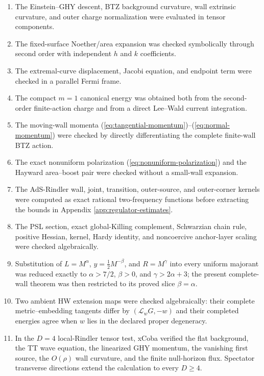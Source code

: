 \begin{enumerate}
\def\labelenumi{\arabic{enumi}.}
\tightlist
\item
  The Einstein--GHY descent, BTZ background curvature, wall extrinsic curvature, and outer charge normalization were evaluated in tensor components.
\item
  The fixed-surface Noether/area expansion was checked symbolically through second order with independent $h$ and $k$ coefficients.
\item
  The extremal-curve displacement, Jacobi equation, and endpoint term were checked in a parallel Fermi frame.
\item
  The compact $m=1$ canonical energy was obtained both from the second-order finite-action charge and from a direct Lee--Wald current integration.
\item
  The moving-wall momenta (\ref{eq:tangential-momentum})--(\ref{eq:normal-momentum}) were checked by directly differentiating the complete finite-wall BTZ action.
\item
  The exact nonuniform polarization (\ref{eq:nonuniform-polarization}) and the Hayward area--boost pair were checked without a small-wall expansion.
\item
  The AdS-Rindler wall, joint, transition, outer-source, and outer-corner kernels were computed as exact rational two-frequency functions before extracting the bounds in Appendix \ref{app:regulator-estimates}.
\item
  The PSL section, exact global-Killing complement, Schwarzian chain rule, positive Hessian, kernel, Hardy identity, and noncoercive anchor-layer scaling were checked algebraically.
\item
  Substitution of $L=M^\alpha$, $y=\tfrac12M^{-\beta}$, and $R=M^\gamma$ into every uniform majorant was reduced exactly to $\alpha>7/2$, $\beta>0$, and $\gamma>2\alpha+3$; the present complete-wall theorem was then restricted to its proved slice $\beta=\alpha$.
\item
  Two ambient HW extension maps were checked algebraically: their complete metric--embedding tangents differ by $(\mathcal L_wG,-w)$ and their completed energies agree when $w$ lies in the declared proper degeneracy.
\item
  In the $D=4$ local-Rindler tensor test, xCoba verified the flat background, the TT wave equation, the linearized GHY momentum, the vanishing first source, the $O(\rho)$ wall curvature, and the finite null-horizon flux. Spectator transverse directions extend the calculation to every $D\geq4$.
\end{enumerate}


